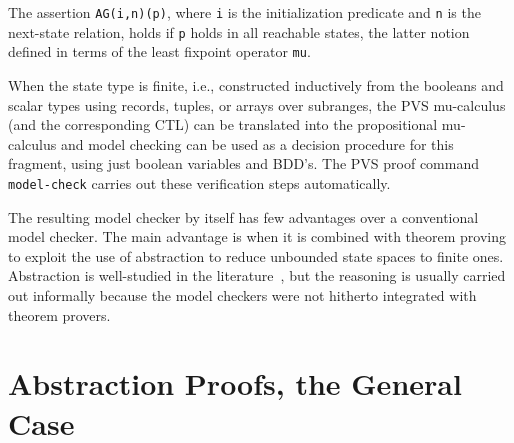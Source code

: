 The assertion  {\tt AG(i,n)(p)}, where {\tt   i} is the initialization
predicate and {\tt n}  is the  next-state relation,  holds if {\tt  p}
holds in  all reachable states, the latter  notion defined in terms of
the least  fixpoint  operator {\tt  mu}.

When the state type is finite, i.e.,  constructed inductively from the
booleans and  scalar types using   records,  tuples, or  arrays   over
subranges, the  PVS   mu-calculus     (and the
corresponding   CTL)  can  be   translated   into  the   propositional
mu-calculus and model checking can be used as a decision procedure for
this fragment, using just boolean variables and BDD's.  The PVS proof
command {\tt model-check} carries out these verification steps
automatically.  

The  resulting  model  checker by  itself  has few  advantages  over a
conventional model checker.  The main advantage is when it is combined
with theorem  proving  to exploit  the use  of abstraction   to reduce
unbounded state spaces to finite ones.  Abstraction is well-studied in
the
literature~\cite{CGL:Model.Check.Abstr,Dams&Grumberg&Gerth:PROCOMET,graf:abstraction95},
but the reasoning is usually  carried out informally because the model
checkers were not hitherto integrated with theorem provers.


\section{Abstraction Proofs, the General Case}

